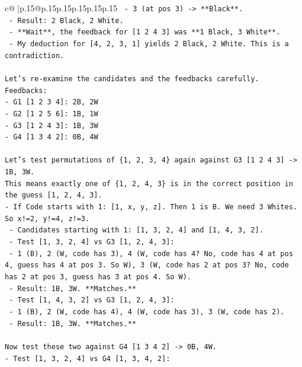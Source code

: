 \documentclass{article}
\begin{document}
{\begin{supertabular}{c@{$\;$}|p{.15\linewidth}@{}p{.15\linewidth}p{.15\linewidth}p{.15\linewidth}p{.15\linewidth}p{.15\linewidth}}
{{{\texttt{    {-} 3 (at pos 3) {-}> **Black**.} \\
\texttt{    {-} Result: 2 Black, 2 White.} \\
\texttt{    {-} **Wait**, the feedback for {[}1 2 4 3{]} was **1 Black, 3 White**.} \\
\texttt{    {-} My deduction for {[}4, 2, 3, 1{]} yields 2 Black, 2 White. This is a contradiction.} \\
\\ 
\texttt{Let's re{-}examine the candidates and the feedbacks carefully.} \\
\texttt{Feedbacks:} \\
\texttt{{-} G1 {[}1 2 3 4{]}: 2B, 2W} \\
\texttt{{-} G2 {[}1 2 5 6{]}: 1B, 1W} \\
\texttt{{-} G3 {[}1 2 4 3{]}: 1B, 3W} \\
\texttt{{-} G4 {[}1 3 4 2{]}: 0B, 4W} \\
\\ 
\texttt{Let's test permutations of \{1, 2, 3, 4\} again against G3 {[}1 2 4 3{]} {-}> 1B, 3W.} \\
\texttt{This means exactly one of \{1, 2, 4, 3\} is in the correct position in the guess {[}1, 2, 4, 3{]}.} \\
\texttt{{-} If Code starts with 1: {[}1, x, y, z{]}. Then 1 is B. We need 3 Whites. So x!=2, y!=4, z!=3.} \\
\texttt{  {-} Candidates starting with 1: {[}1, 3, 2, 4{]} and {[}1, 4, 3, 2{]}.} \\
\texttt{  {-} Test {[}1, 3, 2, 4{]} vs G3 {[}1, 2, 4, 3{]}:} \\
\texttt{    {-} 1 (B), 2 (W, code has 3), 4 (W, code has 4? No, code has 4 at pos 4, guess has 4 at pos 3. So W), 3 (W, code has 2 at pos 3? No, code has 2 at pos 3, guess has 3 at pos 4. So W).} \\
\texttt{    {-} Result: 1B, 3W. **Matches.**} \\
\texttt{  {-} Test {[}1, 4, 3, 2{]} vs G3 {[}1, 2, 4, 3{]}:} \\
\texttt{    {-} 1 (B), 2 (W, code has 4), 4 (W, code has 3), 3 (W, code has 2).} \\
\texttt{    {-} Result: 1B, 3W. **Matches.**} \\
\\ 
\texttt{Now test these two against G4 {[}1 3 4 2{]} {-}> 0B, 4W.} \\
\texttt{{-} Test {[}1, 3, 2, 4{]} vs G4 {[}1, 3, 4, 2{]}:} \\
}}}
\end{supertabular}}
\end{document}
